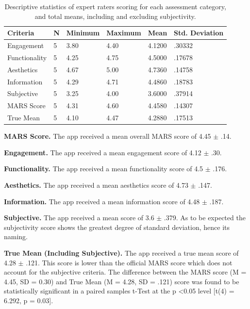
\begin{table}[h]
\centering
\caption{Descriptive statistics of expert raters scoring for each assessment category, and total means, including and excluding subjectivity.}
\label{tbl: gm-expert-ratings}
\begin{tabular}{@{}llllll@{}}
\toprule
Criteria      & N & Minimum & Maximum & Mean   & Std. Deviation \\ \midrule
Engagement    & 5 & 3.80    & 4.40    & 4.1200 & .30332         \\
Functionality & 5 & 4.25    & 4.75    & 4.5000 & .17678         \\
Aesthetics    & 5 & 4.67    & 5.00    & 4.7360 & .14758         \\
Information   & 5 & 4.29    & 4.71    & 4.4860 & .18783         \\
Subjective    & 5 & 3.25    & 4.00    & 3.6000 & .37914         \\
MARS Score    & 5 & 4.31    & 4.60    & 4.4580 & .14307         \\
True Mean     & 5 & 4.10    & 4.47    & 4.2880 & .17513         \\ \bottomrule
\end{tabular}
\end{table}

\textbf{MARS Score.}
The app received a mean overall MARS score of 4.45 $\pm$ .14.

\textbf{Engagement.}
The app received a mean engagement score of 4.12 $\pm$ .30.

\textbf{Functionality.}
The app received a mean functionality score of 4.5 $\pm$ .176.

\textbf{Aesthetics.}
The app received a mean aesthetics score of 4.73 $\pm$ .147.

\textbf{Information.}
The app received a mean information score of 4.48 $\pm$ .187.

\textbf{Subjective.}
The app received a mean score of 3.6 $\pm$ .379.
As to be expected the subjectivity score shows the greatest degree of standard deviation, hence its naming.

\textbf{True Mean (Including Subjective).}
The app received a true mean score of 4.28 $\pm$ .121. This score is lower than the official MARS score which does not account for the subjective criteria. The difference between the MARS score (M = 4.45, SD = 0.30) and True Mean (M = 4.28, SD = .121) score was found to be statistically significant in a paired samples t-Test at the p \textless 0.05 level [t(4) = 6.292, p = 0.03].

